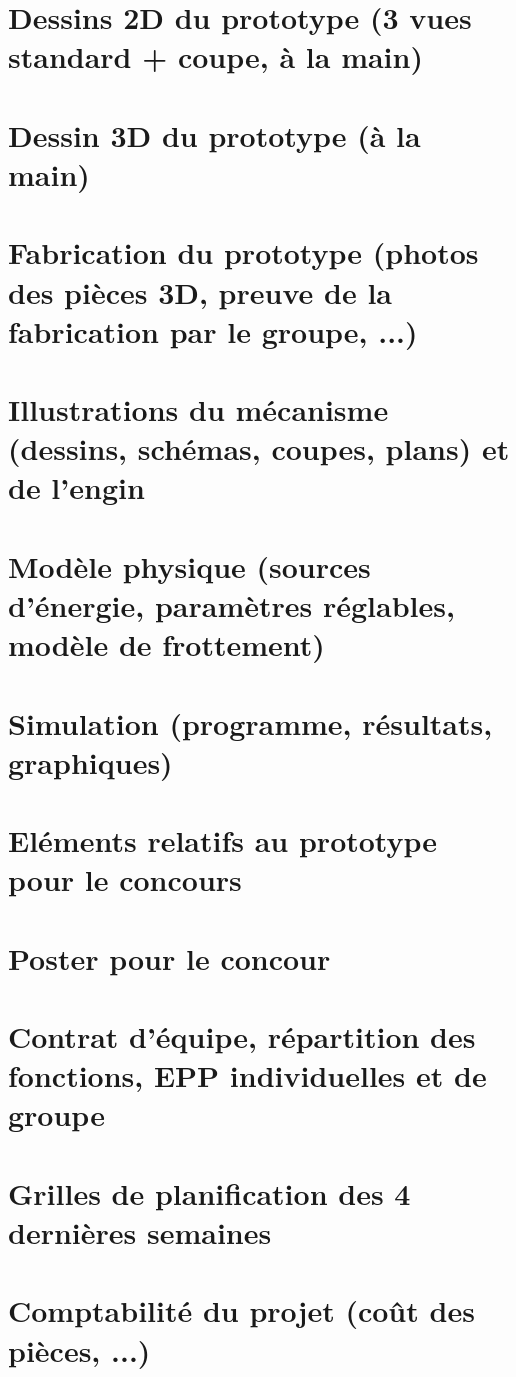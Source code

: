 \documentclass{report}
\begin{document}
\section{Dessins 2D du prototype (3 vues standard + coupe, à la main)}\label{2d}

\section{Dessin 3D du prototype (à la main)}\label{3d}

\section{Fabrication du prototype (photos des pièces 3D, preuve de la fabrication par le groupe, ...)} \label{fab}

\section{Illustrations du mécanisme (dessins, schémas, coupes, plans) et de l’engin} \label{meca}

\section{Modèle physique (sources d’énergie, paramètres réglables, modèle de frottement)} \label{phys}

\section{Simulation (programme, résultats, graphiques)} \label{simu}

\section{Eléments relatifs au prototype pour le concours} \label{conc}

\section{Poster pour le concour} \label{poster}

\section{Contrat d’équipe, répartition des fonctions, EPP individuelles et de groupe} \label{contrat}

\section{Grilles de planification des 4 dernières semaines} \label{plannif}

\section{Comptabilité du projet (coût des pièces, ...)} \label{compta}
\end{document}
